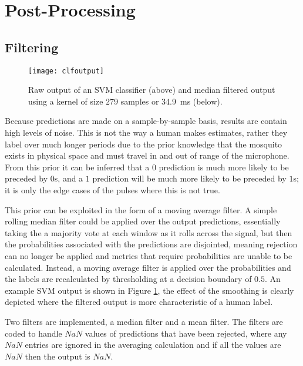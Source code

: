 \section{Post-Processing}
\label{sec:pl-postproc}
    \subsection{Filtering}
    \label{subsec:pl-postproc-filt}
        \begin{figure}[ht]
            \centering
            \texttt{[image: clfoutput]}
            \caption{Raw output of an SVM classifier (above) and median filtered output using a kernel of size $279$ samples or \SI{34.9}{\milli\second} (below).}
            \label{fig:epl-postproc-filt-output}
        \end{figure}
        Because predictions are made on a sample-by-sample basis, results are contain high levels of noise. This is not the way a human makes estimates, rather they label over much longer periods due to the prior knowledge that the mosquito exists in physical space and must travel in and out of range of the microphone. From this prior it can be inferred that a $0$ prediction is much more likely to be preceded by $0$s, and a $1$ prediction will be much more likely to be preceded by $1$s; it is only the edge cases of the pulses where this is not true. 
        
        This prior can be exploited in the form of a moving average filter. A simple rolling median filter could be applied over the output predictions, essentially taking the a majority vote at each window as it rolls across the signal, but then the probabilities associated with the predictions are disjointed, meaning rejection can no longer be applied and metrics that require probabilities are unable to be calculated. Instead, a moving average filter is applied over the probabilities and the labels are recalculated by thresholding at a decision boundary of $0.5$. An example SVM output is shown in Figure \ref {fig:epl-postproc-filt-output}, the effect of the smoothing is clearly depicted where the filtered output is more characteristic of a human label. 
        
        Two filters are implemented, a median filter and a mean filter. The filters are coded to handle $NaN$ values of predictions that have been rejected, where any $NaN$ entries are ignored in the averaging calculation and if all the values are $NaN$ then the output is $NaN$.
        
